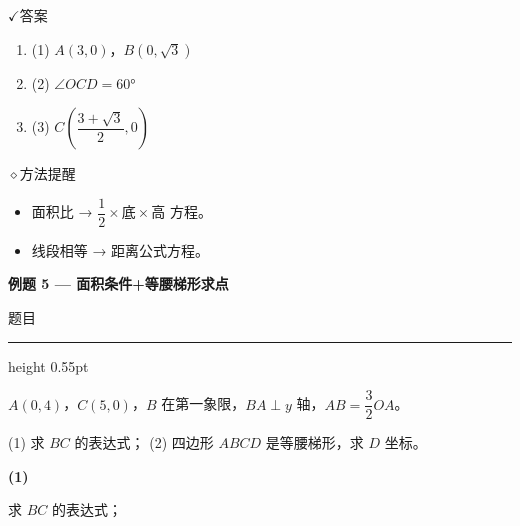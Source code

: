 \documentclass{exam-zh}
\newcommand{\eduSectionTitle}[1]{%
  \needspace{5\baselineskip}%
  \vspace{2mm}
  {\color{edu-blue}\bfseries\large #1}\par
  \vspace{3mm}
}
\newenvironment{eduSubQuestionItem}[1]{%
  \needspace{4\baselineskip}%
  \vspace{2mm}
  \par\noindent
  \hangindent=8mm\hangafter=1
  {\color{edu-blue}\bfseries #1}\enspace
  \begingroup
  \color{edu-ink}
}{%
  \endgroup
  \par
  \vspace{3mm}
}
\newcommand{\eduIconCheck}{\(\checkmark\)}
\newcommand{\eduIconPin}{\(\diamond\)}
\newenvironment{eduProblemBlock}[1][题目]{%
  \needspace{8\baselineskip}
  {\small\color{edu-muted}#1}\par
  \vspace{1.5mm}
  {\color{edu-blue}\hrule height 0.55pt}
  \vspace{4.5mm}
  \begingroup
  \color{edu-ink}
  \large
  \setlength{\parskip}{2.2mm}
  \linespread{1.20}\selectfont
}{%
  \par
  \endgroup
  \vspace{6mm}
}
\newenvironment{eduBulletList}{%
  \begin{itemize}[
    label=\textbullet,
    leftmargin=5mm,
    itemsep=1.2mm,
    topsep=0pt,
    parsep=0pt
  ]
}{%
  \end{itemize}
}
\newenvironment{eduBottomGrid}{%
  \vspace{1mm}
  \par\noindent
}{%
  \par\vspace{1mm}
}
\newenvironment{eduSummaryLeft}{%
  \begin{minipage}[t]{0.30\linewidth}
}{%
  \end{minipage}
}
\newcommand{\eduSummaryDivider}{%
  \hspace{4mm}{\color{edu-line}\vrule width 0.35pt}\hspace{7mm}%
}
\newenvironment{eduSummaryRight}{%
  \begin{minipage}[t]{0.58\linewidth}
}{%
  \end{minipage}
}
\newenvironment{eduPlainList}{%
  \begin{enumerate}[
    label=(\arabic*),
    leftmargin=7mm,
    itemsep=1.2mm,
    topsep=0pt,
    parsep=0pt
  ]
}{%
  \end{enumerate}
}
\begin{document}
\begin{eduBottomGrid}
  \begin{eduSummaryLeft}
    \begin{eduSummaryBlock}{\eduIconCheck}{答案}
    \begin{eduPlainList}
      \item (1) $A(3,0)$，$B(0,\sqrt{3})$      \item (2) $\angle OCD = 60°$      \item (3) $C\left(\dfrac{3+\sqrt{3}}{2}, 0\right)$    \end{eduPlainList}
    \end{eduSummaryBlock}
  \end{eduSummaryLeft}
  \eduSummaryDivider
  \begin{eduSummaryRight}
    \begin{eduSummaryBlock}{\eduIconPin}{方法提醒}
    \begin{eduBulletList}
      \item 面积比 → $\dfrac{1}{2} \times \text{底} \times \text{高}$ 方程。      \item 线段相等 → 距离公式方程。    \end{eduBulletList}
    \end{eduSummaryBlock}
  \end{eduSummaryRight}
\end{eduBottomGrid}



\eduSectionTitle{例题 5 — 面积条件+等腰梯形求点}

\begin{eduProblemBlock}[题目]
$A(0,4)$，$C(5,0)$，$B$ 在第一象限，$BA \perp y$ 轴，$AB=\dfrac{3}{2}OA$。

(1) 求 $BC$ 的表达式；
(2) 四边形 $ABCD$ 是等腰梯形，求 $D$ 坐标。
\end{eduProblemBlock}









\begin{eduSubQuestionItem}{(1)}
求 $BC$ 的表达式；\end{eduSubQuestionItem}
\end{document}
